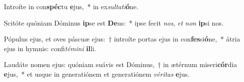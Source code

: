 \item Introíte in con\textbf{spéc}tu \textbf{e}jus,~* in ex\textit{sul}\textit{ta}\textit{ti}\textbf{ó}ne.
\item Scitóte quóniam Dóminus \textbf{ip}se est \textbf{De}us:~* ipse fecit \textit{nos}, \textit{et} \textit{non} \textbf{ip}si nos.
\item Pópulus ejus, et oves páscuæ ejus:~† introíte portas ejus in con\textbf{fes}si\textbf{ó}ne,~* átria ejus in hymnis: confi\textit{té}\textit{mi}\textit{ni} \textbf{il}li.
\item Laudáte nomen ejus: quóniam suávis est Dóminus,~† in ætérnum miseri\textbf{cór}dia \textbf{e}jus,~* et usque in generatiónem et generatiónem \textit{vé}\textit{ri}\textit{tas} \textbf{e}jus.
